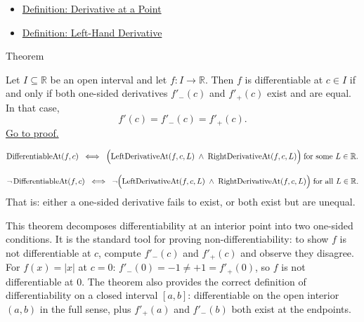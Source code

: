 \begin{remark*}[Dependencies]
\begin{itemize}
  \item \hyperref[def:derivative-at-a-point]{Definition: Derivative at a Point}
  \item \hyperref[def:left-hand-derivative]{Definition: Left-Hand Derivative}
\end{itemize}
\end{remark*}


\begin{theorembox}{Theorem}
\begin{theorem}
\label{thm:differentiability-and-one-sided-derivatives}
Let $I \subseteq \mathbb{R}$ be an open interval and let $f : I \to \mathbb{R}$. Then $f$ is differentiable at $c \in I$ if and only if both one-sided derivatives $f'_-(c)$ and $f'_+(c)$ exist and are equal. In that case,
\[
f'(c) = f'_-(c) = f'_+(c).
\]
\hyperref[prf:differentiability-and-one-sided-derivatives]{Go to proof.}
\end{theorem}
\end{theorembox}

\begin{remark*}
\[
\operatorname{DifferentiableAt}(f, c)
\;\iff\;
\Bigl(\operatorname{LeftDerivativeAt}(f,c,L) \;\land\; \operatorname{RightDerivativeAt}(f,c,L)\Bigr)
\;\text{for some } L \in \mathbb{R}.
\]
\end{remark*}

\begin{remark*}
\[
\lnot\operatorname{DifferentiableAt}(f,c)
\;\iff\;
\lnot\Bigl(\operatorname{LeftDerivativeAt}(f,c,L) \;\land\; \operatorname{RightDerivativeAt}(f,c,L)\Bigr)
\;\text{for all } L \in \mathbb{R}.
\]
That is: either a one-sided derivative fails to exist, or both exist but are unequal.
\end{remark*}

\begin{remark*}[Interpretation]
This theorem decomposes differentiability at an interior point into two one-sided conditions. It is the standard tool for proving non-differentiability: to show $f$ is not differentiable at $c$, compute $f'_-(c)$ and $f'_+(c)$ and observe they disagree. For $f(x) = |x|$ at $c = 0$: $f'_-(0) = -1 \neq +1 = f'_+(0)$, so $f$ is not differentiable at $0$. The theorem also provides the correct definition of differentiability on a closed interval $[a,b]$: differentiable on the open interior $(a,b)$ in the full sense, plus $f'_+(a)$ and $f'_-(b)$ both exist at the endpoints.
\end{remark*}

